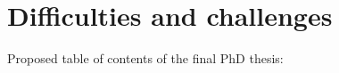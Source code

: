 \documentclass{article}
\begin{document}

   



 






 



\section{Difficulties and challenges} 
%
%      


\appendix
Proposed table of contents of the final PhD thesis:
\end{document}
